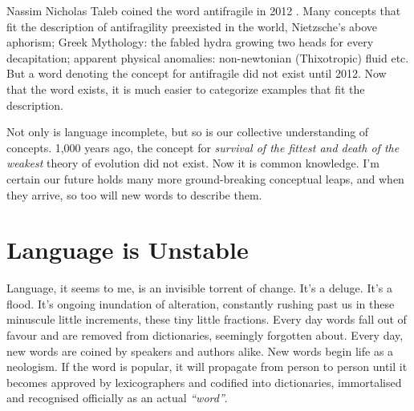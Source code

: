 Nassim Nicholas Taleb coined the word antifragile in 2012 \cite{taleb2012antifragile}. Many concepts that fit the description of antifragility preexisted in the world, Nietzsche's above aphorism; Greek Mythology: the fabled hydra growing two heads for every decapitation; apparent physical anomalies: non-newtonian (Thixotropic) fluid etc. But a word denoting the concept for antifragile did not exist until 2012. Now that the word exists, it is much easier to categorize examples that fit the description.


Not only is language incomplete, but so is our collective understanding of concepts. 1,000 years ago, the concept for \textit{survival of the fittest and death of the weakest} theory of evolution did not exist. Now it is common knowledge. I'm certain our future holds many more ground-breaking conceptual leaps, and when they arrive, so too will new words to describe them.




% 

\section{Language is Unstable}

Language, it seems to me, is an invisible torrent of change. It's a deluge. It's a flood. It's ongoing inundation of alteration,
constantly rushing past us in these minuscule little increments, these tiny little fractions. Every day words fall out of favour and are removed from dictionaries, seemingly forgotten about. Every day, new words are coined by speakers and authors alike. New words begin life as a neologism. If the word is popular, it will propagate from person to person until it becomes approved by lexicographers and codified into dictionaries, immortalised and recognised officially as an actual \textit{``word''}.

